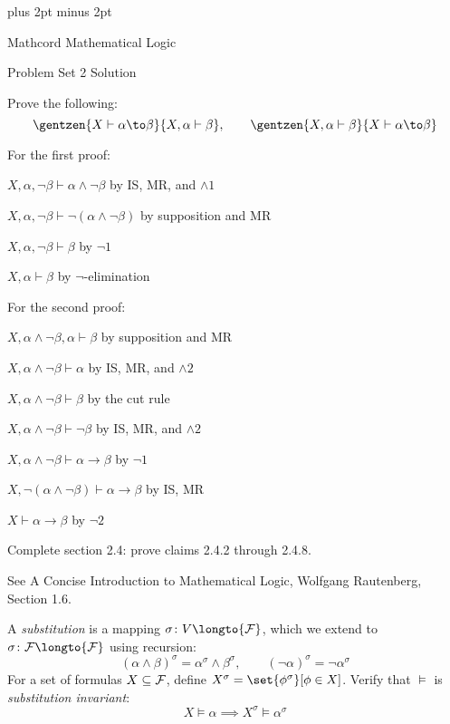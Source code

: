 

\parindent=0pt
\parskip=3pt plus 2pt minus 2pt



\centerline{Mathcord Mathematical Logic}
\centerline{Problem Set 2 Solution}

\bprob

    Prove the following:
    $$ \gentzen{X\vdash\alpha\to\beta}{X,\alpha\vdash\beta},\qquad
    \gentzen{X,\alpha\vdash\beta}{X\vdash\alpha\to\beta} $$

\eprob

For the first proof:
\benum
    \item $X,\alpha,\neg\beta\vdash\alpha\land\neg\beta$ by IS, MR, and $\land1$
    \item $X,\alpha,\neg\beta\vdash\neg(\alpha\land\neg\beta)$ by supposition and MR
    \item $X,\alpha,\neg\beta\vdash\beta$ by $\neg1$
    \item $X,\alpha\vdash\beta$ by $\neg$-elimination
\eenum

For the second proof:
\benum
    \item $X,\alpha\land\neg\beta,\alpha\vdash\beta$ by supposition and MR
    \item $X,\alpha\land\neg\beta\vdash\alpha$ by IS, MR, and $\land2$
    \item $X,\alpha\land\neg\beta\vdash\beta$ by the cut rule
    \item $X,\alpha\land\neg\beta\vdash\neg\beta$ by IS, MR, and $\land2$
    \item $X,\alpha\land\neg\beta\vdash\alpha\to\beta$ by $\neg1$
    \item $X,\neg(\alpha\land\neg\beta)\vdash\alpha\to\beta$ by IS, MR
    \item $X\vdash\alpha\to\beta$ by $\neg2$
\eenum

\bprob

    Complete section 2.4: prove claims 2.4.2 through 2.4.8.

\eprob

See A Concise Introduction to Mathematical Logic, Wolfgang Rautenberg, Section 1.6.

\bprob

    A {\it substitution} is a mapping $\sigma\colon V\longto{\cal F}$, which we extend to
    $\sigma\colon{\cal F}\longto{\cal F}$ using recursion:
    $$ (\alpha\land\beta)^\sigma = \alpha^\sigma\land\beta^\sigma,\qquad
    (\neg\alpha)^\sigma = \neg\alpha^\sigma $$
    For a set of formulas $X\subseteq{\cal F}$, define $X^\sigma=\set{\phi^\sigma}[\phi\in X]$.
    Verify that $\vDash$ is {\it substitution invariant}:
    $$ X\vDash\alpha \implies X^\sigma\vDash\alpha^\sigma $$

